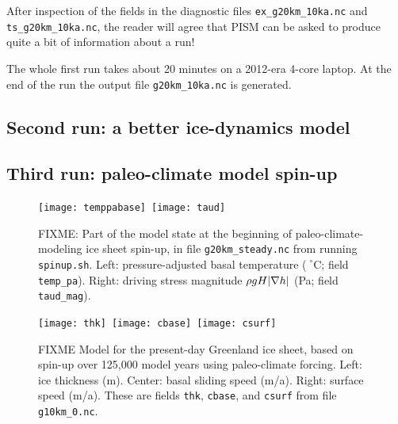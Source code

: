 After inspection of the fields in the diagnostic files \texttt{ex_g20km_10ka.nc} and \texttt{ts_g20km_10ka.nc}, the reader will agree that PISM can be asked to produce quite a bit of information about a run!

The whole first run takes about 20 minutes on a 2012-era 4-core laptop.  At the end of the run the output file \texttt{g20km_10ka.nc} is generated.

\subsection{Second run: a better ice-dynamics model}  \label{subsect:ssarun}  


\subsection{Third run: paleo-climate model spin-up}  \label{subsect:paleorun}  


\begin{figure}[ht]
\centering
\mbox{\texttt{[image: temppabase]}
  \qquad \texttt{[image: taud]}}
\caption{FIXME: Part of the model state at the beginning of paleo-climate-modeling ice sheet spin-up, in file \texttt{g20km_steady.nc} from running \texttt{spinup.sh}.  Left: pressure-adjusted basal temperature ($\phantom{|}^\circ$C; field \texttt{temp_pa}).  Right: driving stress magnitude $\rho g H |\nabla h|$ (Pa; field \texttt{taud_mag}).}
\label{fig:sr-spinstart}
\end{figure}


\begin{figure}[ht]
\centering
\mbox{\texttt{[image: thk]}
  \qquad \texttt{[image: cbase]}
  \qquad \texttt{[image: csurf]}}
\caption{FIXME Model for the present-day Greenland ice sheet, based on spin-up over 125,000 model years using paleo-climate forcing.  Left: ice thickness (m).  Center: basal sliding speed (m/a).  Right: surface speed (m/a).  These are fields \texttt{thk}, \texttt{cbase}, and \texttt{csurf} from file \texttt{g10km_0.nc}.}
\label{fig:sr-spindone-map}
\end{figure}

